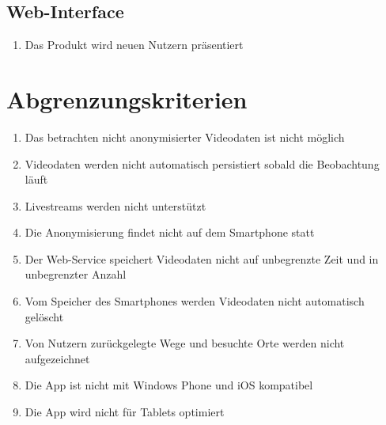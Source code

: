 \subsection{Web-Interface}
	\begin{enumerate}[\bfseries{/WK}3010/]
	\item Das Produkt wird neuen Nutzern präsentiert
	\end{enumerate}

\section{Abgrenzungskriterien}
	\begin{enumerate}[\bfseries{/WK}1010/]
	\item Das betrachten nicht anonymisierter Videodaten ist nicht möglich
	\item Videodaten werden nicht automatisch persistiert sobald die Beobachtung läuft
	\item Livestreams werden nicht unterstützt
	\item Die Anonymisierung findet nicht auf dem Smartphone statt
	\item Der Web-Service speichert Videodaten nicht auf unbegrenzte Zeit und in unbegrenzter Anzahl
	\item Vom Speicher des Smartphones werden Videodaten nicht automatisch gelöscht
	\item Von Nutzern zurückgelegte Wege und besuchte Orte werden nicht aufgezeichnet
	\item Die App ist nicht mit Windows Phone und iOS kompatibel
	\item Die App wird nicht für Tablets optimiert
	\end{enumerate}